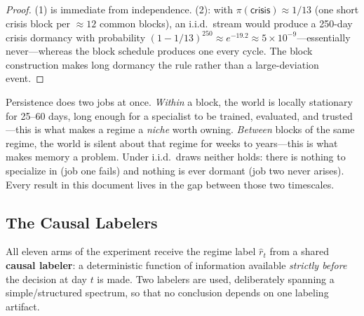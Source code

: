\begin{proof}
(1) is immediate from independence. (2): with
$\pi(\textsf{crisis}) \approx 1/13$ (one short crisis block per $\approx 12$
common blocks), an i.i.d.\ stream would produce a 250-day crisis dormancy
with probability $(1 - 1/13)^{250} \approx e^{-19.2} \approx 5 \times
10^{-9}$---essentially never---whereas the block schedule produces one every
cycle. The block construction makes long dormancy the rule rather than a
large-deviation event.
\end{proof}

\begin{intuition}[title={Persistence is what makes specialization purchasable}]
Persistence does two jobs at once. \emph{Within} a block, the world is locally
stationary for 25--60 days, long enough for a specialist to be trained,
evaluated, and trusted---this is what makes a regime a \emph{niche} worth
owning. \emph{Between} blocks of the same regime, the world is silent about
that regime for weeks to years---this is what makes memory a problem. Under
i.i.d.\ draws neither holds: there is nothing to specialize in (job one fails)
and nothing is ever dormant (job two never arises). Every result in this
document lives in the gap between those two timescales.
\end{intuition}

\subsection{The Causal Labelers}
\label{sec:dd2-labelers}

All eleven arms of the experiment receive the regime label $\hat r_t$ from a
shared \textbf{causal labeler}: a deterministic function of information
available \emph{strictly before} the decision at day $t$ is made. Two labelers
are used, deliberately spanning a simple/structured spectrum, so that no
conclusion depends on one labeling artifact.

